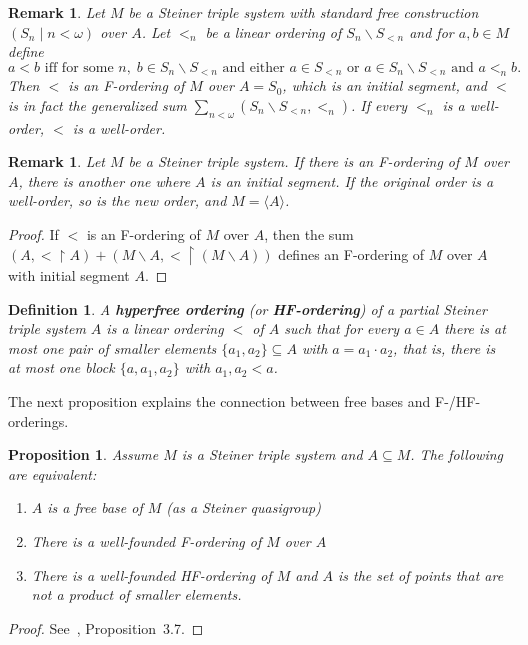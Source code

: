 \documentclass[a4paper, 11pt]{article}
\theoremstyle{note}
\newtheorem{df}[thm]{Definition}
\newtheorem{rmk}[thm]{Remark}
\newtheorem{prop}[thm]{Proposition}
\begin{document}
	\begin{rmk}\label{May12_12.0} Let $M$ be a Steiner triple system with standard free construction \linebreak $(S_n\mid n<\omega)$ over $A$. Let $<_n$ be a linear ordering of $S_n\smallsetminus S_{<n}$ and for $a,b\in M$ define
		$$a<b \mbox{ iff for some } n,\; b\in S_n\smallsetminus S_{<n} \mbox{ and either } a\in S_{<n} \mbox{ or } a\in S_n\smallsetminus S_{<n} \mbox{ and } a<_n b.  $$
Then $<$ is an F-ordering of $M$ over $A=S_0$, which is an initial segment, and $<$ is in fact the generalized sum  $\sum_{n<\omega}(S_n\smallsetminus S_{<n}, <_n)$. If every $<_n$ is a well-order, $<$ is a well-order.
		
		\end{rmk}
		
		
		
	\begin{rmk}\label{May12_12.1}
		 Let $M$ be a Steiner triple system. If there is an F-ordering of $M$ over $A$, there is another one where $A$ is an initial segment. If the original order is a well-order, so is the new order,  and $M=\langle A\rangle$.
	\end{rmk}
	\begin{proof}
		If $<$ is an F-ordering of $M$ over $A$, then the sum $(A,<\restriction A)+(M\smallsetminus A, <\restriction (M\smallsetminus A))$ defines an F-ordering of $M$ over $A$ with initial segment $A$.
	\end{proof}	
	
	\begin{df} A \textbf{hyperfree ordering}  (or \textbf{HF-ordering}) of a partial Steiner triple system  $A$ is a linear ordering $<$ of $A$ such that for every $a\in A$ there is at most one pair of smaller elements $\{a_1,a_2\}\subseteq A$ with $a=a_1\cdot a_2$,  that is, there is at most one block $\{a,a_1,a_2\}$ with $a_1,a_2<a$.
	\end{df}
	
		
The next proposition explains the connection between free bases and F-/HF-orderings.


	\begin{prop}\label{May12_2.2}Assume $M$ is a Steiner triple system and $A\subseteq M$. The following are equivalent:
		\begin{enumerate}
			\item $A$ is a free base of $M$ (as a Steiner quasigroup)
			\item There is a well-founded F-ordering of $M$ over $A$
			\item There is a well-founded HF-ordering of $M$ and $A$ is the set of points that are not a product of smaller elements.
		\end{enumerate}
		\end{prop}
		\begin{proof}  See~\cite{barcas2}, Proposition~3.7.
		\end{proof}
		
\end{document}
